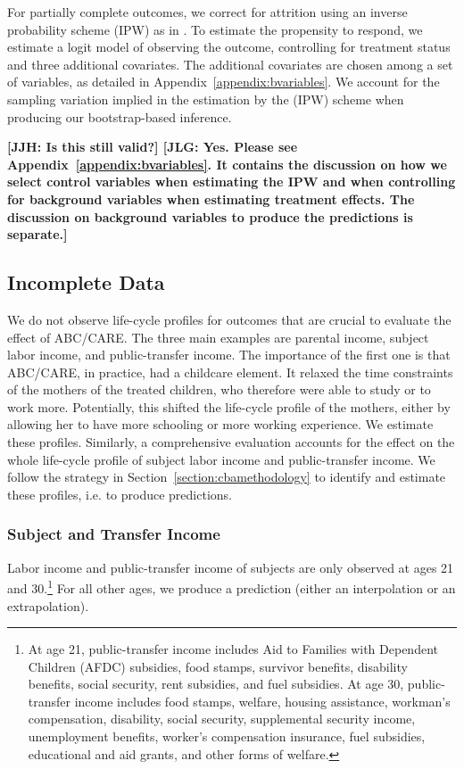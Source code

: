 \noindent For partially complete outcomes, we correct for attrition using an inverse probability scheme (IPW) as in  \citet{Horvitz_Thompson_1952_JASA}. To estimate the propensity to respond, we estimate a logit model of observing the outcome,
controlling for treatment status and three additional covariates. The additional covariates are
chosen among a set of variables, as detailed in Appendix~\ref{appendix:bvariables}. We account for the sampling variation implied in the estimation by the (IPW) scheme when producing our bootstrap-based inference.

\noindent \textbf{[JJH: Is this still valid?] [JLG: Yes. Please see Appendix~\ref{appendix:bvariables}. It contains the discussion on how we select control variables when estimating the IPW and when controlling for background variables when estimating treatment effects. The discussion on background variables to produce the predictions is separate.]}\\

\subsection{Incomplete Data}
\label{app:method_noobs}

\noindent We do not observe life-cycle profiles for outcomes that are crucial to evaluate the effect of ABC/CARE. The three main examples are parental income, subject labor income, and public-transfer income. The importance of the first one is that ABC/CARE, in practice, had a childcare element. It relaxed the time constraints of the mothers of the treated children, who therefore were able to study or to work more. Potentially, this shifted the life-cycle profile of the mothers, either by allowing her to have more schooling or more working experience. We estimate these profiles. Similarly, a comprehensive evaluation accounts for the effect on the whole life-cycle profile of subject labor income and public-transfer income. We follow the strategy in Section~\ref{section:cbamethodology} to identify and estimate these profiles, i.e. to produce predictions.

\subsubsection{Subject and Transfer Income}

\noindent Labor income and public-transfer income of subjects are only observed at ages 21 and 30.\footnote{At age 21, public-transfer income includes Aid to Families with Dependent Children (AFDC) subsidies, food stamps, survivor benefits, disability benefits, social security, rent subsidies, and fuel subsidies. At age 30, public-transfer income includes food stamps, welfare, housing assistance, workman's compensation, disability, social security, supplemental security income, unemployment benefits, worker's compensation insurance, fuel subsidies, educational and aid grants, and other forms of welfare.} For all other ages, we produce a prediction (either an interpolation or an extrapolation).

